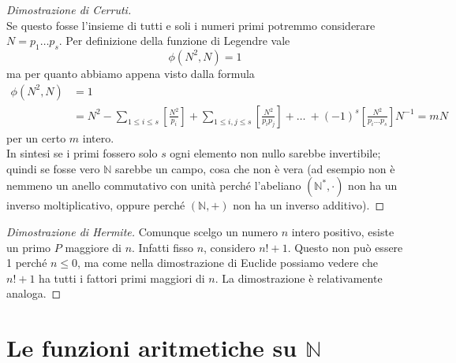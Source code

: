 \begin{proof}[Dimostrazione di Cerruti]
\begin{equation*}
	\end{equation*}
	Se questo fosse l'insieme di tutti e soli i numeri primi potremmo considerare $N=p_1\dots p_s$. Per definizione della funzione di Legendre vale
	\begin{equation*}
	\phi(N^2,N)=1
	\end{equation*}
	ma per quanto abbiamo appena visto dalla formula
	\begin{align*}
	\phi(N^2,N)&=1\\
	&=N^2-\sum_{1\leq i \leq s}\left[\frac{N^2}{p_i}\right]+\sum_{1\leq i,j \leq s}\left[\frac{N^2}{p_ip_j}\right]+ \dots \ + (-1)^s\left[\frac{N^2}{p_i\dots p_s}\right]N^{-1} = mN
	\end{align*}
	per un certo $m$ intero. \\ In sintesi se i primi fossero solo $s$ ogni elemento non nullo sarebbe invertibile; quindi se fosse vero $\mathbb{N}$ sarebbe un campo, cosa che non è vera (ad esempio non è nemmeno un anello commutativo con unità perché l'abeliano $(\mathbb{N}^*,\cdot)$ non ha un inverso moltiplicativo, oppure perché $(\mathbb{N},+)$ non ha un inverso additivo).
\end{proof}
\begin{proof}[Dimostrazione di Hermite]
	Comunque scelgo un numero $n$ intero positivo, esiste un primo $P$ maggiore di $n$. Infatti fisso $n$, considero $n!+1$. Questo non può essere 1 perché $n\leq0$, ma come nella dimostrazione di Euclide possiamo vedere che $n!+1$ ha tutti i fattori primi maggiori di $n$. La dimostrazione è relativamente analoga.
\end{proof}



\section{Le funzioni aritmetiche su $\mathbb{N}$}
